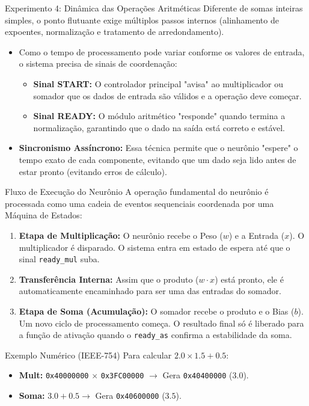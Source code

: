 \documentclass[aspectratio=169]{beamer}
\begin{document}
\begin{frame}{Experimento 4: Dinâmica das Operações Aritméticas}
	\justifying
	Diferente de somas inteiras simples, o ponto flutuante exige múltiplos passos internos (alinhamento de expoentes, normalização e tratamento de arredondamento). 
	
	\begin{itemize}
		\item Como o tempo de processamento pode variar conforme os valores de entrada, o sistema precisa de sinais de coordenação:
		\begin{itemize}
			\item \textbf{Sinal START:} O controlador principal "avisa" ao multiplicador ou somador que os dados de entrada são válidos e a operação deve começar.
			\item \textbf{Sinal READY:} O módulo aritmético "responde" quando termina a normalização, garantindo que o dado na saída está correto e estável.
		\end{itemize}
		\item \textbf{Sincronismo Assíncrono:} Essa técnica permite que o neurônio "espere" o tempo exato de cada componente, evitando que um dado seja lido antes de estar pronto (evitando erros de cálculo).
	\end{itemize}
\end{frame}

\begin{frame}{Fluxo de Execução do Neurônio}
	\justifying
	A operação fundamental do neurônio é processada como uma cadeia de eventos sequenciais coordenada por uma Máquina de Estados:
	
	\begin{enumerate}
		\item \textbf{Etapa de Multiplicação:} O neurônio recebe o Peso ($w$) e a Entrada ($x$). O multiplicador é disparado. O sistema entra em estado de espera até que o sinal \texttt{ready\_mul} suba.
		
		\item \textbf{Transferência Interna:} Assim que o produto ($w \cdot x$) está pronto, ele é automaticamente encaminhado para ser uma das entradas do somador.
		
		\item \textbf{Etapa de Soma (Acumulação):} O somador recebe o produto e o Bias ($b$). Um novo ciclo de processamento começa. O resultado final só é liberado para a função de ativação quando o \texttt{ready\_as} confirma a estabilidade da soma.
	\end{enumerate}
	
	\begin{block}{Exemplo Numérico (IEEE-754)}
		Para calcular $2.0 \times 1.5 + 0.5$:
		\begin{itemize}
			\item \textbf{Mult:} \texttt{0x40000000} $\times$ \texttt{0x3FC00000} $\rightarrow$ Gera \texttt{0x40400000} ($3.0$).
			\item \textbf{Soma:} $3.0 + 0.5 \rightarrow$ Gera \texttt{0x40600000} ($3.5$).
		\end{itemize}
	\end{block}
\end{frame}
\end{document}

